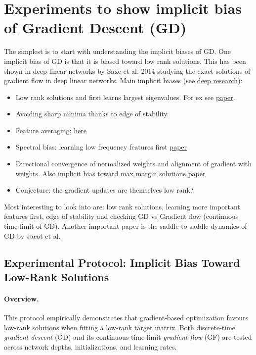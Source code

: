 \documentclass[11pt]{article}
\begin{document}
\section*{Experiments to show implicit bias of Gradient Descent (GD)}
The simplest is to start with understanding the implicit biases of GD. One implicit bias of GD is that it is biased toward low rank solutions. This has been shown in deep linear networks by Saxe et al. 2014 studying the exact solutions of gradient flow in deep linear networks.
Main implicit biases (see \href{https://claude.ai/public/artifacts/c54b85ba-9f9b-4d01-8407-2e3a3ab4639b}{deep research}):
\begin{itemize}
    \item Low rank solutions and first learns largest eigenvalues. For ex see \href{https://arxiv.org/pdf/2011.13772}{paper}.
    \item Avoiding sharp minima thanks to edge of stability.
    \item Feature averaging; \href{https://arxiv.org/pdf/2410.10322}{here}
    \item Spectral bias: learning low frequency features first \href{https://arxiv.org/pdf/1806.08734}{paper}
    \item Directional convergence of normalized weights and alignment of gradient with weights. Also implicit bias toward max margin solutions \href{https://arxiv.org/pdf/2006.06657}{paper}
    \item Conjecture: the gradient updates are themselves low rank?
\end{itemize}
Most interesting to look into are: low rank solutions, learning more important features first, edge of stability and checking GD vs Gradient flow (continuous time limit of GD). Another important paper is the saddle-to-saddle dynamics of GD by Jacot et al.

\subsection*{Experimental Protocol: Implicit Bias Toward Low-Rank Solutions}
\label{sec:prot}

\paragraph{Overview.}
This protocol empirically demonstrates that gradient‐based optimization favours low‐rank solutions when fitting a low‐rank target matrix.  Both discrete-time \emph{gradient descent} (GD) and its continuous‐time limit \emph{gradient flow} (GF) are tested across network depths, initializations, and learning rates.
\end{document}
